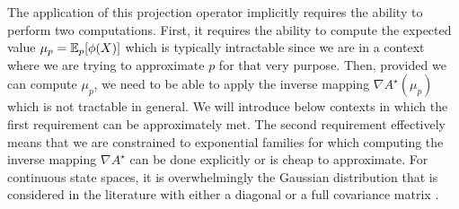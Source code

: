 The application of this projection operator implicitly requires the ability to perform two computations. First, it requires the ability to compute the expected value $\mu_p=\mathbb E_{p}[\phi(X)]$ which is typically intractable since we are in a context where we are trying to approximate $p$ for that very purpose. Then, provided we can compute $\mu_p$, we need to be able to apply the inverse mapping $\nabla A^{\star}(\mu_p)$ which is not tractable in general. We will introduce below contexts in which the first requirement can be approximately met. The second requirement effectively means that we are constrained to exponential families for which computing the inverse mapping $\nabla A^{\star}$ can be done explicitly or is cheap to approximate. For continuous state spaces, it is overwhelmingly the Gaussian distribution that is considered in the literature with either a diagonal or a full covariance matrix \citep{kuss05,herbrich05,herbrich06,yu06,hernandez13}.
%
